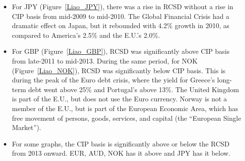 \begin{itemize}
\item For JPY (Figure~\ref{Liao_JPY}), there was a rise in RCSD without a rise in CIP basis from mid-2009 to mid-2010.  The Global Financial Crisis had a dramatic effect on Japan, but it rebounded with 4.2\% growth in 2010, as compared to America's 2.5\% and the E.U.'s 2.0\%. 

\item For GBP (Figure~\ref{Liao_GBP}), RCSD was significantly above CIP basis from late-2011 to mid-2013.  During the same period, for NOK (Figure~\ref{Liao_NOK}), RCSD was significantly below CIP basis.  This is during the peak of the Euro debt crisis, where the yield for Greece's long-term debt went above 25\% and Portugal's above 13\%.  The United Kingdom is part of the E.U., but does not use the Euro currency.  Norway is not a member of the E.U., but is part of the European Economic Area, which has free movement of persons, goods, services, and capital (the ``European Single Market'').  

\item For some graphs, the CIP basis is significantly above or below the RCSD from 2013 onward.  EUR, AUD, NOK has it above and JPY has it below.

\end{itemize}






